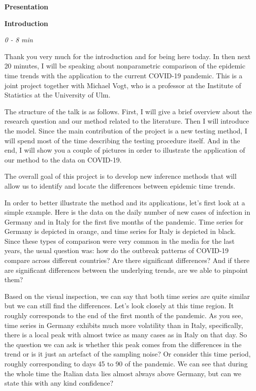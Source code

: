 \documentclass[a4paper,12pt]{article}
\begin{document}
\begin{center}
\Large{\textbf{Presentation}}
\end{center}
\textbf{Introduction}

\emph{0 - 8 min}

Thank you very much for the introduction and for being here today. In then next 20 minutes, I will be speaking about nonparametric comparison of the epidemic time trends with the application to the current COVID-19 pandemic. This is a joint project together with Michael Vogt, who is a professor at the Institute of Statistics at the University of Ulm.

The structure of the talk is as follows. First, I will give a brief overview about the research question and our method related to the literature. Then I will introduce the model. Since the main contribution of the project is a new testing method, I will spend most of the time describing the testing procedure itself. And in the end, I will show you a couple of pictures in order to illustrate the application of our method to the data on COVID-19.

The overall goal of this project is to develop new inference methods that will allow us to identify and locate the differences between epidemic time trends. 

In order to better illustrate the method and its applications, let's first look at a simple example. Here is the data on the daily number of new cases of infection in Germany and in Italy for the first five months of the pandemic. Time series for Germany is depicted in orange, and time series for Italy is depicted in black. Since these types of comparison were very common in the media for the last years, the usual question was: how do the outbreak patterns of COVID-19 compare across different countries? Are there significant differences? And if there are significant differences between the underlying trends, are we able to pinpoint them?

Based on the visual inspection, we can say that both time series are quite similar but we can still find the differences. Let's look closely at this time region. It roughly corresponds to the end of the first month of the pandemic. As you see, time series in Germany exhibits much more volatility than in Italy, specifically, there is a local peak with almost twice as many cases as in Italy on that day. So the question we can ask is whether this peak comes from the differences in the trend or is it just an artefact of the sampling noise? Or consider this time period, roughly corresponding to days 45 to 90 of the pandemic. We can see that during the whole time the Italian data lies almost always above Germany, but can we state this with any kind confidence?
\end{document}
